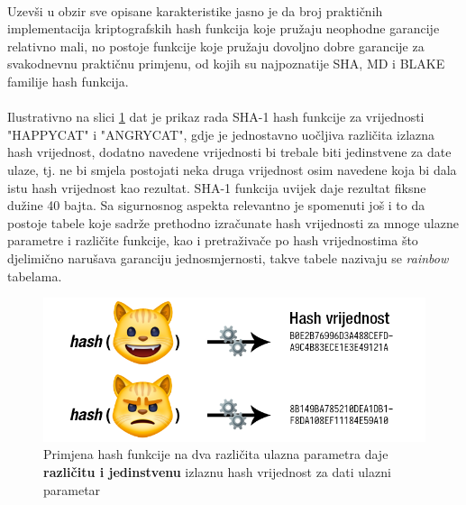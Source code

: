 \paragraph*{}
Uzevši u obzir sve opisane karakteristike jasno je da broj praktičnih implementacija kriptografskih hash funkcija koje pružaju neophodne garancije relativno mali, no postoje funkcije koje pružaju dovoljno dobre garancije za svakodnevnu praktičnu primjenu, od kojih su najpoznatije SHA, MD i BLAKE familije hash funkcija.

\paragraph*{}
Ilustrativno na slici \ref{fig:hash_dia} dat je prikaz rada SHA-1 hash funkcije za vrijednosti "HAPPYCAT" i "ANGRYCAT", gdje je jednostavno uočljiva različita izlazna hash vrijednost, dodatno navedene vrijednosti bi trebale biti jedinstvene za date ulaze, tj. ne bi smjela postojati neka druga vrijednost osim navedene koja bi dala istu hash vrijednost kao rezultat. SHA-1 funkcija uvijek daje rezultat fiksne dužine 40 bajta. Sa sigurnosnog aspekta relevantno je spomenuti još i to da postoje tabele koje sadrže prethodno izračunate hash vrijednosti za mnoge ulazne parametre i različite funkcije, kao i pretraživače po hash vrijednostima što djelimično narušava garanciju jednosmjernosti, takve tabele nazivaju se \textit{rainbow} tabelama.

\begin{figure}[H]
    \centering
    \includegraphics[width=1.0\textwidth]{material/hash_dia}
    \caption{Primjena hash funkcije na dva različita ulazna parametra daje \textbf{različitu i jedinstvenu} izlaznu hash vrijednost za dati ulazni parametar}
    \label{fig:hash_dia}
\end{figure}

